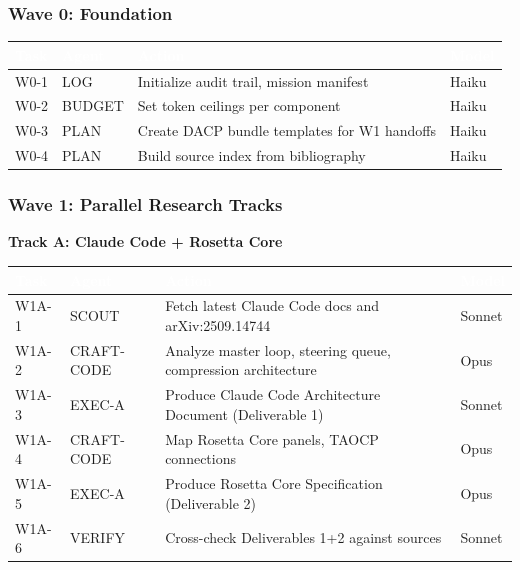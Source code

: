 \documentclass[11pt,letterpaper]{article}
\newcommand{\tableheader}[1]{\textbf{\sffamily\textcolor{white}{#1}}}
\begin{document}
\subsubsection{Wave 0: Foundation}

\begin{center}
\begin{tabularx}{\textwidth}{L{2cm}L{3cm}XL{2cm}}
\toprule
{}
\tableheader{Task} & \tableheader{Agent} & \tableheader{Action} & \tableheader{Model} \\
\midrule
W0-1 & LOG & Initialize audit trail, mission manifest & Haiku \\
W0-2 & BUDGET & Set token ceilings per component & Haiku \\
W0-3 & PLAN & Create DACP bundle templates for W1 handoffs & Haiku \\
W0-4 & PLAN & Build source index from bibliography & Haiku \\
\bottomrule
\end{tabularx}
\end{center}

\subsubsection{Wave 1: Parallel Research Tracks}

\textbf{Track A: Claude Code + Rosetta Core}

\begin{center}
\begin{tabularx}{\textwidth}{L{2cm}L{3cm}XL{2cm}}
\toprule
{}
\tableheader{Task} & \tableheader{Agent} & \tableheader{Action} & \tableheader{Model} \\
\midrule
W1A-1 & SCOUT & Fetch latest Claude Code docs and arXiv:2509.14744 & Sonnet \\
W1A-2 & CRAFT-CODE & Analyze master loop, steering queue, compression architecture & Opus \\
W1A-3 & EXEC-A & Produce Claude Code Architecture Document (Deliverable 1) & Sonnet \\
W1A-4 & CRAFT-CODE & Map Rosetta Core panels, TAOCP connections & Opus \\
W1A-5 & EXEC-A & Produce Rosetta Core Specification (Deliverable 2) & Opus \\
W1A-6 & VERIFY & Cross-check Deliverables 1+2 against sources & Sonnet \\
\bottomrule
\end{tabularx}
\end{center}
\end{document}
